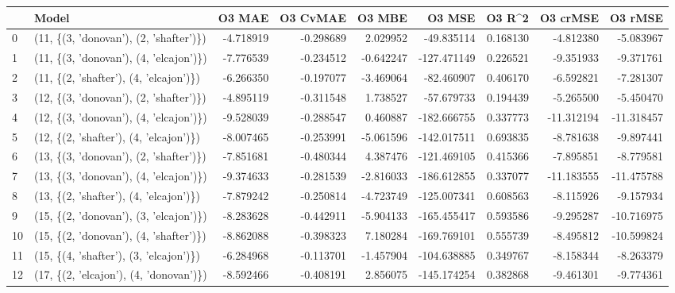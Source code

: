 \begin{tabular}{llrrrrrrr}
\toprule
{} &                                   Model &     O3 MAE &  O3 CvMAE &    O3 MBE &      O3 MSE &    O3 R\textasciicircum2 &   O3 crMSE &    O3 rMSE \\
\midrule
0  &  (11, \{(3, 'donovan'), (2, 'shafter')\}) &  -4.718919 & -0.298689 &  2.029952 &  -49.835114 &  0.168130 &  -4.812380 &  -5.083967 \\
1  &  (11, \{(3, 'donovan'), (4, 'elcajon')\}) &  -7.776539 & -0.234512 & -0.642247 & -127.471149 &  0.226521 &  -9.351933 &  -9.371761 \\
2  &  (11, \{(2, 'shafter'), (4, 'elcajon')\}) &  -6.266350 & -0.197077 & -3.469064 &  -82.460907 &  0.406170 &  -6.592821 &  -7.281307 \\
3  &  (12, \{(3, 'donovan'), (2, 'shafter')\}) &  -4.895119 & -0.311548 &  1.738527 &  -57.679733 &  0.194439 &  -5.265500 &  -5.450470 \\
4  &  (12, \{(3, 'donovan'), (4, 'elcajon')\}) &  -9.528039 & -0.288547 &  0.460887 & -182.666755 &  0.337773 & -11.312194 & -11.318457 \\
5  &  (12, \{(2, 'shafter'), (4, 'elcajon')\}) &  -8.007465 & -0.253991 & -5.061596 & -142.017511 &  0.693835 &  -8.781638 &  -9.897441 \\
6  &  (13, \{(3, 'donovan'), (2, 'shafter')\}) &  -7.851681 & -0.480344 &  4.387476 & -121.469105 &  0.415366 &  -7.895851 &  -8.779581 \\
7  &  (13, \{(3, 'donovan'), (4, 'elcajon')\}) &  -9.374633 & -0.281539 & -2.816033 & -186.612855 &  0.337077 & -11.183555 & -11.475788 \\
8  &  (13, \{(2, 'shafter'), (4, 'elcajon')\}) &  -7.879242 & -0.250814 & -4.723749 & -125.007341 &  0.608563 &  -8.115926 &  -9.157934 \\
9  &  (15, \{(2, 'donovan'), (3, 'elcajon')\}) &  -8.283628 & -0.442911 & -5.904133 & -165.455417 &  0.593586 &  -9.295287 & -10.716975 \\
10 &  (15, \{(2, 'donovan'), (4, 'shafter')\}) &  -8.862088 & -0.398323 &  7.180284 & -169.769101 &  0.555739 &  -8.495812 & -10.599824 \\
11 &  (15, \{(4, 'shafter'), (3, 'elcajon')\}) &  -6.284968 & -0.113701 & -1.457904 & -104.638885 &  0.349767 &  -8.158344 &  -8.263379 \\
12 &  (17, \{(2, 'elcajon'), (4, 'donovan')\}) &  -8.592466 & -0.408191 &  2.856075 & -145.174254 &  0.382868 &  -9.461301 &  -9.774361 \\

\end{tabular}
